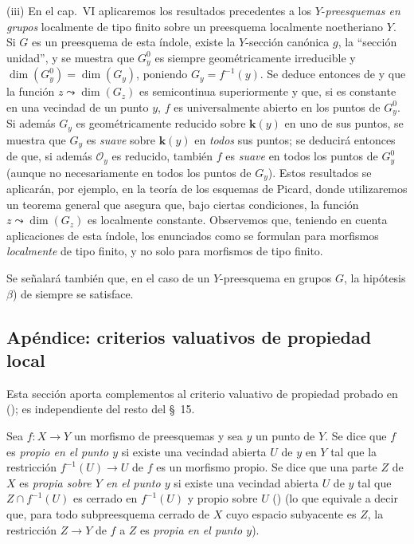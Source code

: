 \begin{remarks}[15.6.10]
(iii)
En el cap.\ VI aplicaremos los resultados precedentes a los $Y$-\emph{preesquemas en grupos} localmente de tipo finito sobre un preesquema localmente noetheriano $Y$.
Si $G$ es un preesquema de esta índole, existe la $Y$-sección canónica $g$, la ``sección unidad'', y se muestra que $G_y^0$ es siempre geométricamente irreducible y $\dim(G_y^0)=\dim(G_y)$, poniendo $G_y=f^{-1}(y)$.
Se deduce entonces de  y  que la función $z\leadsto\dim(G_z)$ es semicontinua superiormente y que, si es constante en una vecindad de un punto $y$, $f$ es universalmente abierto en los puntos de $G_y^0$.
Si además $G_y$ es geométricamente reducido sobre $\boldsymbol{k}(y)$ en uno de sus puntos, se muestra que $G_y$ es \emph{suave}  sobre $\boldsymbol{k}(y)$ en \emph{todos} sus puntos; se deducirá entonces de  que, si además $\mathcal O_y$ es reducido, también $f$ es \emph{suave} en todos los puntos de $G_y^0$ (aunque no necesariamente en todos los puntos de $G_y$).
Estos resultados se aplicarán, por ejemplo, en la teoría de los esquemas de Picard, donde utilizaremos un teorema general que asegura que, bajo ciertas condiciones, la función $z\leadsto\dim(G_z)$ es localmente constante.
Observemos que, teniendo en cuenta aplicaciones de esta índole, los enunciados como  se formulan para morfismos \emph{localmente} de tipo finito, y no solo para morfismos de tipo finito.

Se señalará también que, en el caso de un $Y$-preesquema en grupos $G$, la hipótesis $\beta$) de  siempre se satisface.
\end{remarks}


\subsection{Apéndice: criterios valuativos de propiedad local}
\label{subsection:IV.15.7}

Esta sección aporta complementos al criterio valuativo de propiedad probado en (); es independiente del resto del \S~15.

\begin{definition}[15.7.1]
\label{IV.15.7.1}
Sea $f:X\to Y$ un morfismo de preesquemas y sea $y$ un punto de $Y$.
Se dice que $f$ es \emph{propio en el punto $y$} si existe una vecindad abierta $U$ de $y$ en $Y$ tal que la restricción $f^{-1}(U)\to U$ de $f$ es un morfismo propio.
Se dice que una parte $Z$ de $X$ es \emph{propia sobre $Y$ en el punto $y$} si existe una vecindad abierta $U$ de $y$ tal que $Z\cap f^{-1}(U)$ es cerrado en $f^{-1}(U)$ y propio sobre $U$ () \textup{(lo que equivale a decir que, para todo subpreesquema cerrado de $X$ cuyo espacio subyacente es $Z$, la restricción $Z\to Y$ de $f$ a $Z$ es \emph{propia en el punto $y$})}.
\end{definition}

